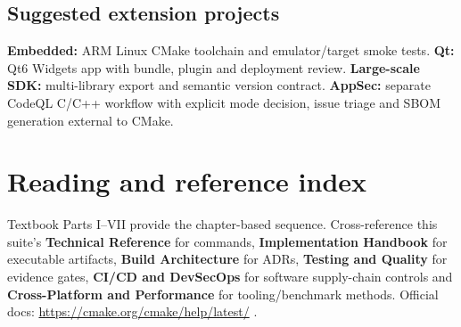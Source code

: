 \documentclass[11pt,letterpaper,oneside]{report}
\begin{document}
\section{Suggested extension
projects}\label{suggested-extension-projects}

\textbf{Embedded:} ARM Linux CMake toolchain and emulator/target smoke
tests. \textbf{Qt:} Qt6 Widgets app with bundle, plugin and deployment
review. \textbf{Large-scale SDK:} multi-library export and semantic
version contract. \textbf{AppSec:} separate CodeQL C/C++ workflow with
explicit mode decision, issue triage and SBOM generation external to
CMake.

\chapter{Reading and reference index}\label{reading-and-reference-index}

Textbook Parts I--VII provide the chapter-based sequence.
Cross-reference this suite's \textbf{Technical Reference} for commands,
\textbf{Implementation Handbook} for executable artifacts, \textbf{Build
Architecture} for ADRs, \textbf{Testing and Quality} for evidence gates,
\textbf{CI/CD and DevSecOps} for software supply-chain controls and
\textbf{Cross-Platform and Performance} for tooling/benchmark methods.
Official docs: \url{https://cmake.org/cmake/help/latest/} .
\end{document}
